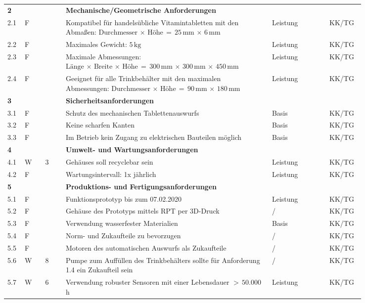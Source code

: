 \begin{longtable}{C{0.03\linewidth}C{0.05\linewidth}C{0.05\linewidth}L{0.5\linewidth}C{0.14\linewidth}C{0.07\linewidth}}
	\textbf{2} & & & \textbf{Mechanische/Geometrische Anforderungen} &&\\
	2.1 & F & & Kompatibel für handelsübliche Vitamintabletten mit den Abmaßen: $\text{Durchmesser}\,\times\,\text{Höhe}\,=\,25\,\text{mm}\,\times\,6\,\text{mm}$ & Leistung  & KK/TG\\
	2.2 & F & & Maximales Gewicht: $5\,\text{kg}$ & Leistung & KK/TG\\
	2.3 & F & & Maximale Abmessungen: $\text{Länge}\,\times\,\text{Breite}\,\times\,\text{Höhe}\,=\,300\,\text{mm}\,\times\,300\,\text{mm}\,\times\,450\,\text{mm}$ & Leistung  & KK/TG\\
	2.4 & F & & Geeignet für alle Trinkbehälter mit den maximalen Abmessungen: $\text{Durchmesser}\,\times\,\text{Höhe}\,=\,90\,\text{mm}\,\times\,180\,\text{mm}$ & Leistung & KK/TG\\
	
	\midrule
	
	\textbf{3} & & & \textbf{Sicherheitsanforderungen} &&\\
	3.1 & F & & Schutz des mechanischen Tablettenauswurfs & Basis & KK/TG\\
	3.2 & F & & Keine scharfen Kanten & Basis & KK/TG\\
	3.3 & F & & Im Betrieb kein Zugang zu elektrischen Bauteilen möglich & Basis & KK/TG\\
	
	\midrule 
	
	\textbf{4} & & & \textbf{Umwelt- und Wartungsanforderungen} &&\\
	4.1 & W & 3 & Gehäuses soll recyclebar sein & Leistung & KK/TG\\
	4.2 & F & & Wartungsintervall: 1x jährlich & Leistung & KK/TG\\
	
	\midrule
	
	\textbf{5} & & & \textbf{Produktions- und Fertigungsanforderungen}&& \\
	5.1 & F & & Funktionsprototyp bis zum 07.02.2020 & Leistung & KK/TG\\
	5.2 & F & & Gehäuse des Prototyps mittels RPT per 3D-Druck & / & KK/TG\\
	5.3 & F & & Verwendung wasserfester Materialien &Basis& KK/TG\\
	5.4 & F & & Norm- und Zukaufteile zu bevorzugen & / & KK/TG\\
	5.5 & F & & Motoren des automatischen Auswurfs als Zukaufteile & / & KK/TG\\
	5.6 & W & 8 & Pumpe zum Auffüllen des Trinkbehälters sollte für Anforderung 1.4 ein Zukaufteil sein & / & KK/TG\\
	5.7 & W & 6 & Verwendung robuster Sensoren mit einer Lebensdauer $>\, 50.000\,$h & Leistung & KK/TG\\
	

\end{longtable}
